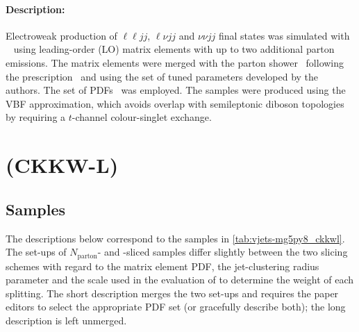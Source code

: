 \paragraph{Description:}

Electroweak production of \(\ell\ell jj\), \(\ell\nu jj\) and \(\nu\nu jj\) final states
was simulated with \SHERPA[2.2.1]~\cite{Bothmann:2019yzt} using
leading-order (LO) matrix elements with up to two additional parton emissions.
The matrix elements were merged with the \SHERPA parton
shower~\cite{Schumann:2007mg} following the \MEPSatLO
prescription~\cite{Catani:2001cc} and using the set of tuned
parameters developed by the \SHERPA authors.  The \NNPDF[3.0nnlo] set of
PDFs~\cite{Ball:2014uwa} was employed. The samples were produced
using the VBF approximation, which avoids overlap  with semileptonic
diboson topologies by requiring a \(t\)-channel colour-singlet exchange.



\section[MadGraph5 (CKKW-L)]{\MADGRAPH (CKKW-L)}

\subsection*{Samples}

The descriptions below correspond to the samples in
\cref{tab:vjets-mg5py8_ckkwl}. The set-ups of \(N_\text{parton}\)- and
\HT-sliced samples differ slightly between the two slicing schemes
with regard to the matrix element PDF, the jet-clustering radius parameter
and the scale used in the evaluation of  \alphas to determine the weight of
each splitting. The short description merges the two set-ups and requires
the paper editors to select the appropriate PDF set (or gracefully describe
both); the long description is left unmerged.

